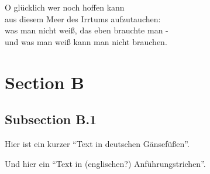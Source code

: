 \documentclass[12pt,draft,a4paper]{scrartcl}
\begin{document}
O glücklich wer noch hoffen kann\\
aus diesem Meer des Irrtums aufzutauchen:\\
was man nicht weiß, das eben brauchte man -\\
und was man weiß kann man nicht brauchen.

\newpage
\section{Section B}
\subsection{Subsection B.1}
Hier ist ein  kurzer "`Text in deutschen Gänsefüßen"'.

Und hier ein ``Text in (englischen?) Anführungstrichen''.
\end{document}
